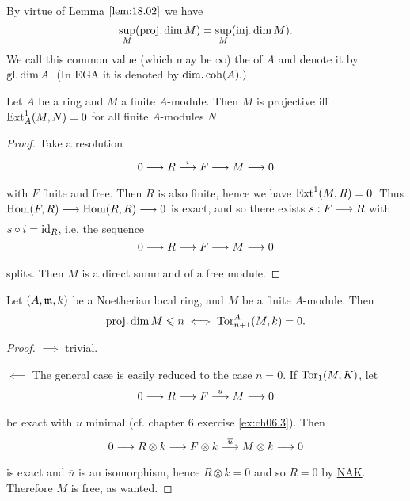 \documentclass[../main]{subfiles}
\begin{document}
By virtue of Lemma $\ref{lem:18.02}$ we have \[\sup_M(\operatorname{proj. dim} M)=\sup_M(\operatorname{inj. dim} M).\] We call this common value (which may be $\infty$) the  of $A$ and denote it by $\operatorname{gl. dim} A$. (In EGA it is denoted by $\operatorname{dim.coh} (A).)$

\begin{parlemma}\label{lem:18.03}
Let $A$ be a  ring and $M$ a finite $A$-module. Then $M$ is projective iff $\operatorname{Ext}_A^1(M,N)=0$ for all finite $A$-modules $N$. 
\end{parlemma}
\begin{proof}
Take a resolution \[0 \varrightarrow{} R \varrightarrow{i} F \varrightarrow{} M \varrightarrow{} 0\] with $F$ finite and free. Then $R$ is also finite, hence we have $\operatorname{Ext}^1(M,R)=0$. Thus $\Hom(F,R) \varrightarrow{} \Hom(R,R)\varrightarrow{} 0$ is exact, and so there exists $s: F \varrightarrow{} R$ with $s \circ i=\operatorname{id}_R$, i.e. the sequence \[0 \varrightarrow{} R \varrightarrow{} F \varrightarrow{} M \varrightarrow{} 0\] splits. Then $M$ is a direct summand of a free module.
\end{proof}

\begin{lemma}\label{lem:18.04}
Let $(A,\mathfrak{m}, k)$ be a Noetherian local ring, and $M$ be a finite $A$-module. Then
\[\operatorname{proj. dim} M \leqslant n \iff \operatorname{Tor}_{n+1}^A(M,k)=0.\]
\end{lemma}

\begin{proof}
$\implies$ trivial.

$\impliedby$ The general case is easily reduced to the case $n=0$. If $\operatorname{Tor}_1(M,K)$, let \[0 \varrightarrow{} R \varrightarrow{} F \varrightarrow{u} M \varrightarrow{} 0\] be exact with $u$ minimal (cf. chapter 6 exercise \ref{ex:ch06.3}). Then \[0 \varrightarrow{} R \otimes k \varrightarrow{} F \otimes k \varrightarrow{\overline{u}} M \otimes k \varrightarrow{} 0\] is exact and $\overline{u}$ is an isomorphism, hence $R \otimes k=0$ and so $R=0$ by \hyperref[NAK]{NAK}. Therefore $M$ is free, as wanted. 
\end{proof}
\end{document}
